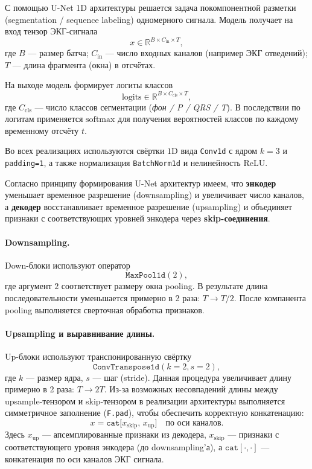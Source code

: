 \documentclass[11pt, oneside, a4paper]{article}
\begin{document}
С помощью U-Net 1D архитектуры решается задача покомпонентной разметки (segmentation / sequence labeling) одномерного сигнала. Модель получает на вход тензор ЭКГ-сигнала
\[
x \in \mathbb{R}^{B \times C_{\text{in}} \times T},
\]
где $B$ --- размер батча; $C_{\text{in}}$ --- число входных каналов (например ЭКГ отведений);
$T$ --- длина фрагмента (окна) в отсчётах.

На выходе модель формирует логиты классов
\[
\text{logits} \in \mathbb{R}^{B \times C_{\text{cls}} \times T},
\]
где $C_{\text{cls}}$ --- число классов сегментации (\textit{фон / P / QRS / T}).
В последствии по логитам применяется $\mathrm{softmax}$ для получения вероятностей классов по каждому временному отсчёту $t$.

Во всех реализациях используются свёртки $1$D вида \texttt{Conv1d} с ядром $k=3$ и \texttt{padding=1}, а также нормализация \texttt{BatchNorm1d} и нелинейность ReLU.

Согласно принципу формирования U-Net архитектур имеем, что \textbf{энкодер} уменьшает временное разрешение (downsampling) и увеличивает число каналов, а \textbf{декодер} восстанавливает временное разрешение (upsampling) и объединяет признаки с соответствующих уровней энкодера через \textbf{skip-соединения}.

\paragraph{Downsampling.}
Down-блоки используют оператор
\[
\texttt{MaxPool1d}(2),
\]
где аргумент $2$ соответствует размеру окна pooling. В результате длина последовательности уменьшается примерно в 2 раза: $T \rightarrow T/2$. После компанента pooling выполняется сверточная обработка признаков.

\paragraph{Upsampling и выравнивание длины.}
Up-блоки используют транспонированную свёртку
\[
\texttt{ConvTranspose1d}(k{=}2, s{=}2),
\]
где $k$ --- размер ядра, $s$ --- шаг (stride). Данная процедура увеличивает длину примерно в 2 раза: $T \rightarrow 2T$.
Из-за возможных несовпадений длины между upsample-тензором и skip-тензором в реализации архитектуры выполняется симметричное заполнение (\texttt{F.pad}), чтобы обеспечить корректную конкатенацию:
\[
x = \texttt{cat}\big[x_{\text{skip}},\, x_{\text{up}}\big] \quad \text{по оси каналов}.
\]
Здесь $x_{\text{up}}$ --- апсемплированные признаки из декодера, $x_{\text{skip}}$ --- признаки с соответствующего уровня энкодера
(до downsampling'а), а $\texttt{cat}[\cdot,\cdot]$ --- конкатенация по оси каналов ЭКГ сигнала.
\end{document}
